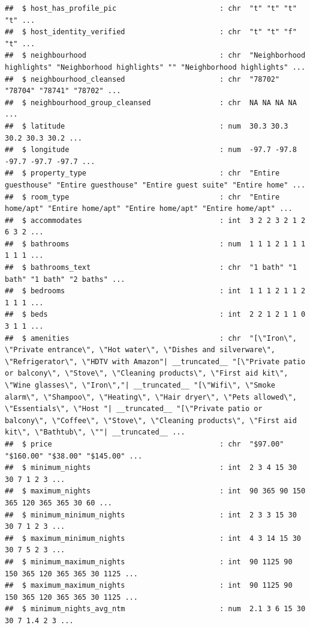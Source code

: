 \documentclass[
]{article}
\begin{document}
\begin{verbatim}
##  $ host_has_profile_pic                        : chr  "t" "t" "t" "t" ...
##  $ host_identity_verified                      : chr  "t" "t" "f" "t" ...
##  $ neighbourhood                               : chr  "Neighborhood highlights" "Neighborhood highlights" "" "Neighborhood highlights" ...
##  $ neighbourhood_cleansed                      : chr  "78702" "78704" "78741" "78702" ...
##  $ neighbourhood_group_cleansed                : chr  NA NA NA NA ...
##  $ latitude                                    : num  30.3 30.3 30.2 30.3 30.2 ...
##  $ longitude                                   : num  -97.7 -97.8 -97.7 -97.7 -97.7 ...
##  $ property_type                               : chr  "Entire guesthouse" "Entire guesthouse" "Entire guest suite" "Entire home" ...
##  $ room_type                                   : chr  "Entire home/apt" "Entire home/apt" "Entire home/apt" "Entire home/apt" ...
##  $ accommodates                                : int  3 2 2 3 2 1 2 6 3 2 ...
##  $ bathrooms                                   : num  1 1 1 2 1 1 1 1 1 1 ...
##  $ bathrooms_text                              : chr  "1 bath" "1 bath" "1 bath" "2 baths" ...
##  $ bedrooms                                    : int  1 1 1 2 1 1 2 1 1 1 ...
##  $ beds                                        : int  2 2 1 2 1 1 0 3 1 1 ...
##  $ amenities                                   : chr  "[\"Iron\", \"Private entrance\", \"Hot water\", \"Dishes and silverware\", \"Refrigerator\", \"HDTV with Amazon"| __truncated__ "[\"Private patio or balcony\", \"Stove\", \"Cleaning products\", \"First aid kit\", \"Wine glasses\", \"Iron\","| __truncated__ "[\"Wifi\", \"Smoke alarm\", \"Shampoo\", \"Heating\", \"Hair dryer\", \"Pets allowed\", \"Essentials\", \"Host "| __truncated__ "[\"Private patio or balcony\", \"Coffee\", \"Stove\", \"Cleaning products\", \"First aid kit\", \"Bathtub\", \""| __truncated__ ...
##  $ price                                       : chr  "$97.00" "$160.00" "$38.00" "$145.00" ...
##  $ minimum_nights                              : int  2 3 4 15 30 30 7 1 2 3 ...
##  $ maximum_nights                              : int  90 365 90 150 365 120 365 365 30 60 ...
##  $ minimum_minimum_nights                      : int  2 3 3 15 30 30 7 1 2 3 ...
##  $ maximum_minimum_nights                      : int  4 3 14 15 30 30 7 5 2 3 ...
##  $ minimum_maximum_nights                      : int  90 1125 90 150 365 120 365 365 30 1125 ...
##  $ maximum_maximum_nights                      : int  90 1125 90 150 365 120 365 365 30 1125 ...
##  $ minimum_nights_avg_ntm                      : num  2.1 3 6 15 30 30 7 1.4 2 3 ...

\end{verbatim}
\end{document}
